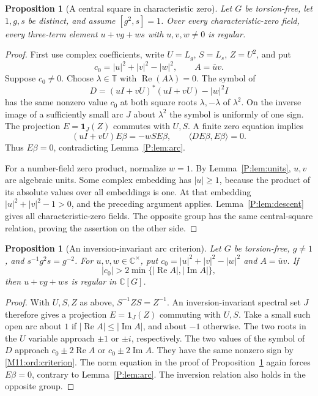 \documentclass[11pt,a4paper,oneside]{report}
\newtheorem{proposition}[theorem]{Proposition}
\theoremstyle{definition}
\theoremstyle{remark}
\newcommand{\C}{\mathbb C}
\newcommand{\T}{\mathbb T}
\begin{document}
\begin{proposition}[A central square in characteristic zero]
\label{M11:ord:central}
Let $G$ be torsion-free, let $1,g,s$ be distinct, and assume
$[g^2,s]=1$. Over every characteristic-zero field, every three-term
element $u+vg+ws$ with $u,v,w\ne0$ is regular.
\end{proposition}
\begin{proof}
First use complex coefficients, write $U=L_g$, $S=L_s$, $Z=U^2$,
and put
\[
 c_0=|u|^2+|v|^2-|w|^2,\qquad A=\overline u v.
\]
Suppose $c_0\ne0$. Choose $\lambda\in\T$ with
$\operatorname{Re}(A\lambda)=0$. The symbol of
\[
 D=(uI+vU)^*(uI+vU)-|w|^2I
\]
has the same nonzero value $c_0$ at both square roots
$\lambda,-\lambda$ of $\lambda^2$. On the inverse image of a
sufficiently small arc $J$ about $\lambda^2$ the symbol is uniformly
of one sign. The projection $E=\mathbf1_J(Z)$ commutes with $U,S$.
A finite zero equation implies
\[
 (uI+vU)E\beta=-wSE\beta,\qquad
 \langle DE\beta,E\beta\rangle=0.
\]
Thus $E\beta=0$, contradicting Lemma~\ref{P:lem:arc}.

For a number-field zero product, normalize $w=1$. By
Lemma~\ref{P:lem:units}, $u,v$ are algebraic units. Some complex
embedding has $|u|\ge1$, because the product of its absolute values
over all embeddings is one. At that embedding
$|u|^2+|v|^2-1>0$, and the preceding argument applies.
Lemma~\ref{P:lem:descent} gives all characteristic-zero fields.
The opposite group has the same central-square relation, proving
the assertion on the other side.
\end{proof}

\begin{proposition}[An inversion-invariant arc criterion]
\label{M11:ord:arc}
Let $G$ be torsion-free, $g\ne1$, and
$s^{-1}g^2s=g^{-2}$. For $u,v,w\in\C^\times$, put
$c_0=|u|^2+|v|^2-|w|^2$ and $A=\overline u v$. If
\begin{equation}\label{M11:ord:criterion}
 |c_0|>2\min\{|\operatorname{Re}A|,|\operatorname{Im}A|\},
\end{equation}
then $u+vg+ws$ is regular in $\C[G]$.
\end{proposition}
\begin{proof}
With $U,S,Z$ as above, $S^{-1}ZS=Z^{-1}$. An inversion-invariant
spectral set $J$ therefore gives a projection $E=\mathbf1_J(Z)$
commuting with $U,S$. Take a small such open arc about $1$ if
$|\operatorname{Re}A|\le|\operatorname{Im}A|$, and about $-1$
otherwise. The two roots in the $U$ variable approach $\pm1$ or
$\pm i$, respectively. The two values of the symbol of $D$ approach
$c_0\pm2\operatorname{Re}A$ or $c_0\pm2\operatorname{Im}A$.
They have the same nonzero sign by \eqref{M11:ord:criterion}.
The norm equation in the proof of Proposition~\ref{M11:ord:central}
again forces $E\beta=0$, contrary to Lemma~\ref{P:lem:arc}.
The inversion relation also holds in the opposite group.
\end{proof}
\end{document}
